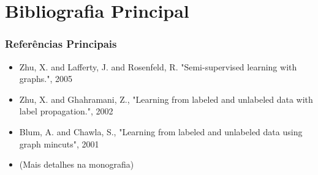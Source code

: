 \documentclass{beamer}
\begin{document}
  \section{Bibliografia Principal}
    \frame{\tableofcontents[current]}
    \frame
    {
      \frametitle{Referências Principais}
      \begin{itemize}
        \item Zhu, X. and Lafferty, J. and Rosenfeld, R. "Semi-supervised learning with graphs.", 2005
        \item Zhu, X. and Ghahramani, Z., "Learning from labeled and unlabeled data with label propagation.", 2002
        \item Blum, A. and Chawla, S., "Learning from labeled and unlabeled data using graph mincuts", 2001
        \item (Mais detalhes na monografia)
      \end{itemize}
    }
\end{document}
